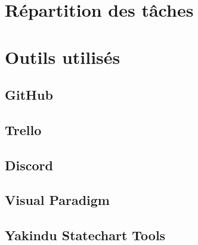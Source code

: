 \section{Répartition des tâches}

\section{Outils utilisés}
\subsection{GitHub}

\subsection{Trello}

\subsection{Discord}

\subsection{Visual Paradigm}

\subsection{Yakindu Statechart Tools}
\newpage